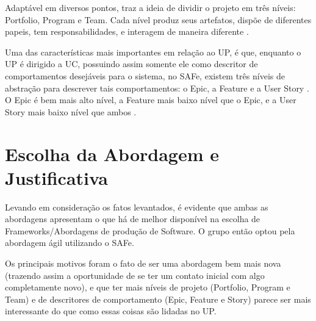 Adaptável em diversos pontos, traz a ideia de dividir o projeto em três níveis: Portfolio, Program e Team. Cada nível produz seus artefatos, dispõe de diferentes papeis, tem responsabilidades, e interagem de maneira diferente \cite[p. 124-125]{safe001}.

Uma das características mais importantes em relação ao UP, é que, enquanto o UP é dirigido a UC, possuindo assim somente ele como descritor de comportamentos desejáveis para o sistema, no SAFe, existem três níveis de abstração para descrever tais comportamentos: o Epic, a Feature e a User Story \cite[p. 182-183]{safe001}. O Epic é bem mais alto nível, a Feature mais baixo nível que o Epic, e a User Story mais baixo nível que ambos \cite[p. 182-183]{safe001}.

\section{Escolha da Abordagem e Justificativa}
Levando em consideração os fatos levantados, é evidente que ambas as abordagens apresentam o que há de melhor disponível na escolha de Frameworks/Abordagens de produção de Software. O grupo então optou pela abordagem ágil utilizando o SAFe.

Os principais motivos foram o fato de ser uma abordagem bem mais nova (trazendo assim a oportunidade de se ter um contato inicial com algo completamente novo), e que ter mais níveis de projeto (Portfolio, Program e Team) e de descritores de comportamento (Epic, Feature e Story) parece ser mais interessante do que como essas coisas são lidadas no UP.
